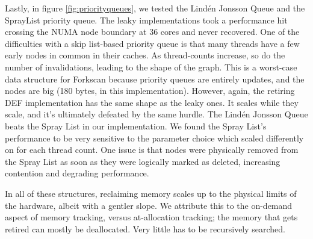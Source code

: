 Lastly, in figure \ref{fig:priorityqueues}, we tested the Lind{\'e}n Jonsson Queue and the SprayList priority queue.  The leaky implementations took a performance hit crossing the NUMA node boundary at 36 cores and never recovered.  One of the difficulties with a skip list-based priority queue is that many threads have a few early nodes in common in their caches.  As thread-counts increase, so do the number of invalidations, leading to the shape of the graph.  This is a worst-case data structure for Forkscan because priority queues are entirely updates, and the nodes are big (180 bytes, in this implementation).  However, again, the retiring DEF implementation has the same shape as the leaky ones.  It scales while they scale, and it's ultimately defeated by the same hurdle. The Lind{\'e}n Jonsson Queue beats the Spray List in our implementation. We found the Spray List's performance to be very sensitive to the parameter choice which scaled differently on for each thread count. One issue is that nodes were physically removed from the Spray List as soon as they were logically marked as deleted, increasing contention and degrading performance. 

In all of these structures, reclaiming memory scales up to the physical limits of the hardware, albeit with a gentler slope.  We attribute this to the on-demand aspect of memory tracking, versus at-allocation tracking; the memory that gets retired can mostly be deallocated.  Very little has to be recursively searched.

